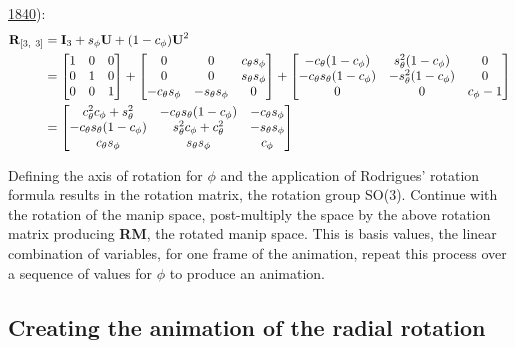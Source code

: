 \protect\hyperlink{ref-rodrigues_lois_1840}{1840}): \begin{align*}
    \textbf{R}_{[3,~3]} 
    &= \textbf{I}_3 + s_\phi\*\textbf{U} + (1-c_\phi)\*\textbf{U}^2 \\
        &=
    \begin{bmatrix}
      1&0&0 \\ 
      0&1&0 \\ 
      0&0&1 \\
    \end{bmatrix} +
    \begin{bmatrix}
      0 & 0 & c_\theta s_\phi \\
      0 & 0 & s_\theta s_\phi \\
      -c_\theta s_\phi & -s_\theta s_\phi & 0 \\
    \end{bmatrix} +
    \begin{bmatrix}
      -c_\theta (1-c_\phi) & s^2_\theta (1-c_\phi) & 0 \\
      -c_\theta s_\theta (1-c_\phi) & -s^2_\theta (1-c_\phi) & 0 \\
      0 & 0 & c_\phi-1 \\
    \end{bmatrix} \\
    &= 
    \begin{bmatrix}
      c_\theta^2 c_\phi + s_\theta^2 &
      -c_\theta s_\theta (1 - c_\phi) &
      -c_\theta s_\phi \\
      -c_\theta s_\theta (1 - c_\phi) &
      s_\theta^2 c_\phi + c_\theta^2 &
      -s_\theta s_\phi \\
      c_\theta s_\phi &
      s_\theta s_\phi &
      c_\phi
    \end{bmatrix} \\
\end{align*}

Defining the axis of rotation for \(\phi\) and the application of
Rodrigues' rotation formula results in the rotation matrix, the rotation
group SO(3). Continue with the rotation of the manip space,
post-multiply the space by the above rotation matrix producing
\textbf{RM}, the rotated manip space. This is basis values, the linear
combination of variables, for one frame of the animation, repeat this
process over a sequence of values for \(\phi\) to produce an animation.

\hypertarget{creating-the-animation-of-the-radial-rotation}{%
\subsection{Creating the animation of the radial
rotation}\label{creating-the-animation-of-the-radial-rotation}}

